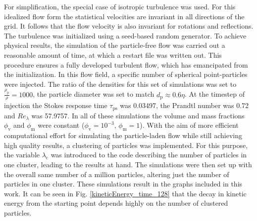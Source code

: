 \documentclass[11pt,a4paper,openany,oneside,parskip=half*]{article}
\begin{document}
For simplification, the special case of isotropic turbulence was used. For this idealized flow form the statistical 
velocities are invariant in all directions of the grid. It follows that the flow velocity is also invariant for rotations and reflections. 
The turbulence was initialized using a seed-based random generator. To achieve physical results, the simulation of the particle-free flow was carried out a reasonable amount of time, 
at which a restart file was written out. This procedure ensures a fully developed turbulent 
flow, which has emancipated from the initialization. In this flow field, a specific number of spherical point-particles were injected. 
\newline
The ratio of the densities for this set of simulations was set to $\frac{\rho_\mathrm{p}}{\rho} = 1000$, the particle diameter was set to match $d_\mathrm{p} \approx 0.6 \eta$. At the timestep of injection the Stokes response time $\tau_\mathrm{ps}$ was 0.03497, the Prandtl number was 0.72 and $Re_\lambda$ was 57.9757. In all of these simulations the volume and mass fractions $\phi_\mathrm{v}$ and $\phi_\mathrm{m}$ were constant ($\phi_\mathrm{v}= 10^{-3}$, $\phi_\mathrm{m}=1$). 
\newline
With the aim of more efficient computational effort for simulating the particle-laden flow while still achieving high quality results, a clustering of particles was implemented. For this purpose, the variable $\lambda_\mathrm{c}$ was introduced to the code describing the number of particles in one cluster, leading to the results at hand. The simulations were then set up with the overall same number of  a million particles, altering just the number of particles in one cluster. These simulations result in the graphs included in this work. 
It can be seen in Fig. \ref{kineticEnergy_time_128} that the decay in kinetic energy from the starting point depends highly on the number of clustered particles.
\end{document}
